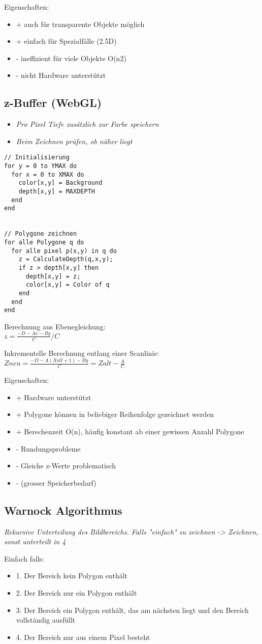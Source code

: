 Eigenschaften:
\begin{itemize}
	\item + auch für transparente Objekte möglich 
	\item + einfach für Spezialfälle (2.5D)
	\item - ineffizient für viele Objekte O(n2)
	\item - nicht Hardware unterstützt
\end{itemize}

\subsection{z-Buffer (WebGL)}
\begin{itemize}
	\item \textit{Pro Pixel Tiefe zusätzlich zur Farbe speichern}
	\item \textit{Beim Zeichnen prüfen, ob näher liegt}
\end{itemize}

\begin{lstlisting}
// Initialisierung
for y = 0 to YMAX do
  for x = 0 to XMAX do
    color[x,y] = Background
    depth[x,y] = MAXDEPTH 
  end
end


// Polygone zeichnen 
for alle Polygone q do
  for alle pixel p(x,y) in q do
    z = CalculateDepth(q,x,y); 
    if z > depth[x,y] then
      depth[x,y] = z;
      color[x,y] = Color of q 
    end
  end 
end
\end{lstlisting}

Berechnung aus Ebenegleichung: \\
$z = \frac{-D - Ax - By}{C} / C$

Inkrementelle Berechnung entlang einer Scanlinie:\\
$Zneu = \frac{-D -A(Xalt + 1) - By}{C} = Zalt - \frac{A}{C}$

Eigenschaften:
\begin{itemize}
	\item + Hardware unterstützt
	\item + Polygone können in beliebiger Reihenfolge gezeichnet werden
	\item + Berechenzeit O(n), häufig konstant ab einer gewissen Anzahl Polygone 
	\item - Rundungsprobleme
	\item - Gleiche z-Werte problematisch
	\item - (grosser Speicherbedarf)
\end{itemize}
	
\subsection{Warnock Algorithmus}
\textit{Rekursive Unterteilung des Bildbereichs. Falls "einfach" zu zeichnen -> Zeichnen, sonst unterteilt in 4}

Einfach falls:
\begin{itemize}
	\item 1. Der Bereich kein Polygon enthält
	\item 2. Der Bereich nur ein Polygon enthält
	\item 3. Der Bereich ein Polygon enthält, das am nächsten liegt und den Bereich vollständig ausfüllt 
	\item 4. Der Bereich nur aus einem Pixel besteht
\end{itemize}